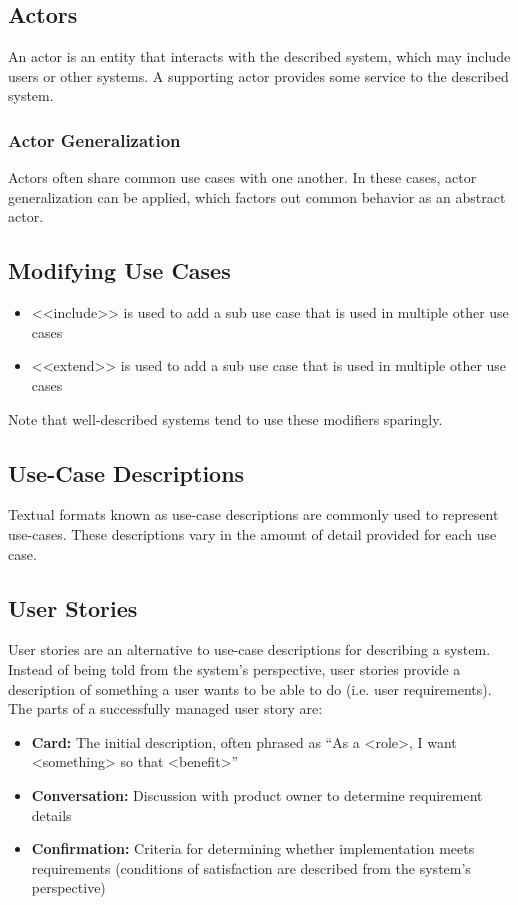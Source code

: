 \documentclass[12pt,titlepage]{article}
\begin{document}
      \subsection{Actors}
        An actor is an entity that interacts with the described system, which may include users or other systems. A supporting actor provides some service to the
        described system.

        \subsubsection{Actor Generalization}
          Actors often share common use cases with one another. In these cases, actor generalization can be applied, which factors out common behavior as an
          abstract actor.

      \subsection{Modifying Use Cases}
        \begin{itemize}
          \item <<include>> is used to add a sub use case that is used in multiple other use cases
          \item <<extend>> is used to add a sub use case that is used in multiple other use cases
        \end{itemize}
        Note that well-described systems tend to use these modifiers sparingly.

      \subsection{Use-Case Descriptions}
        Textual formats known as use-case descriptions are commonly used to represent use-cases. These descriptions vary in the amount of detail provided for
        each use case.

      \subsection{User Stories}
        User stories are an alternative to use-case descriptions for describing a system. Instead of being told from the system's perspective, user stories
        provide a description of something a user wants to be able to do (i.e. user requirements). The parts of a successfully managed user story are:
        \begin{itemize}
          \item \textbf{Card:} The initial description, often phrased as ``As a <role>, I want <something> so that <benefit>''
          \item \textbf{Conversation:} Discussion with product owner to determine requirement details
          \item \textbf{Confirmation:} Criteria for determining whether implementation meets requirements (conditions of satisfaction are described
          from the system's perspective)
        \end{itemize}
\end{document}
